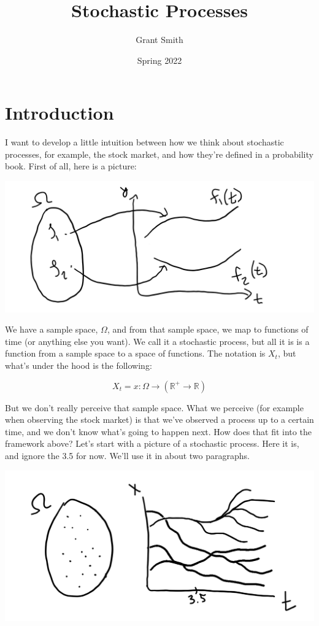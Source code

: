\documentclass{article}
\title{Stochastic Processes}
\author{Grant Smith }
\date{Spring 2022}
\begin{document}
\maketitle

\section{Introduction}

I want to develop a little intuition between how we think about stochastic processes, for example, the stock market, and how they're defined in a probability book.  First of all, here is a picture:

\includegraphics[width=\textwidth]{stochastic_ image.png}

We have a sample space, $\Omega$, and from that sample space, we map to functions of time (or anything else you want).  We call it a stochastic process, but all it is is a function from a sample space to a space of functions.  The notation is $X_t$, but what's under the hood is the following:

$$X_t = x : \Omega \rightarrow \left(\mathbb{R}^+ \rightarrow  \mathbb{R} \right)$$ 

But we don't really perceive that sample space.  What we perceive (for example when observing the stock market) is that we've observed a process up to a certain time, and we don't know what's going to happen next.  How does that fit into the framework above? Let's start with a picture of a stochastic process.  Here it is, and ignore the 3.5 for now. We'll use it in about two paragraphs.

\includegraphics[width=\textwidth]{filtration_part_1.png}
\end{document}
